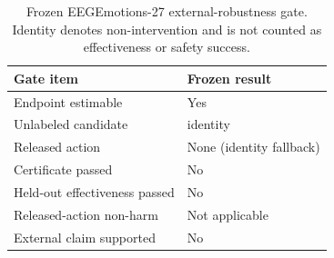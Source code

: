 
\begin{table}[t]
\centering
\caption{Frozen EEGEmotions-27 external-robustness gate. Identity denotes non-intervention and is not counted as effectiveness or safety success.}
\label{tab:eegemotions27-gate}
\begin{tabular}{ll}
\toprule
Gate item & Frozen result \\
\midrule
Endpoint estimable & Yes \\
Unlabeled candidate & identity \\
Released action & None (identity fallback) \\
Certificate passed & No \\
Held-out effectiveness passed & No \\
Released-action non-harm & Not applicable \\
External claim supported & No \\
\bottomrule
\end{tabular}
\end{table}
